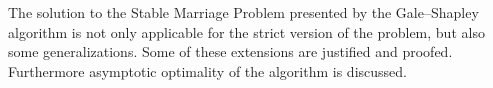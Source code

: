 The solution to the Stable Marriage Problem presented by the Gale–Shapley algorithm \cite{Gale:1962} is not only applicable for the strict version of the problem, but also some generalizations. Some of these extensions are justified and proofed. Furthermore asymptotic optimality of the algorithm is discussed.
